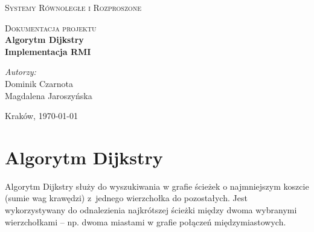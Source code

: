 \documentclass{article}
\begin{document}
\begin{titlepage}
\begin{center}

\textsc{\LARGE Systemy Równoległe i Rozproszone}\\[1.5cm]

\vskip 3cm

\textsc{\Large Dokumentacja projektu}\\[0.5cm]

{ \huge \bfseries Algorytm Dijkstry \\[0.4cm] 
	\Large \bfseries Implementacja RMI \\[0.4cm] }
\vskip 6cm
\begin{minipage}{0.4\textwidth}
\begin{flushleft} \large
\emph{Autorzy:}\\
Dominik Czarnota \\
Magdalena Jaroszyńska
\end{flushleft}
\end{minipage}
\begin{minipage}{0.4\textwidth}
\begin{flushright} \large
\end{flushright}
\end{minipage}

\vfill

{\large Kraków, \today}

\end{center}
\end{titlepage}

\tableofcontents
\clearpage


\section{Algorytm Dijkstry}

Algorytm Dijkstry służy do wyszukiwania w grafie ścieżek o najmniejszym koszcie (sumie wag krawędzi) z~jednego wierzchołka do pozostałych. Jest wykorzystywany do odnalezienia najkrótszej ścieżki między dwoma wybranymi wierzchołkami -- np. dwoma miastami w grafie połączeń międzymiastowych.
\end{document}
